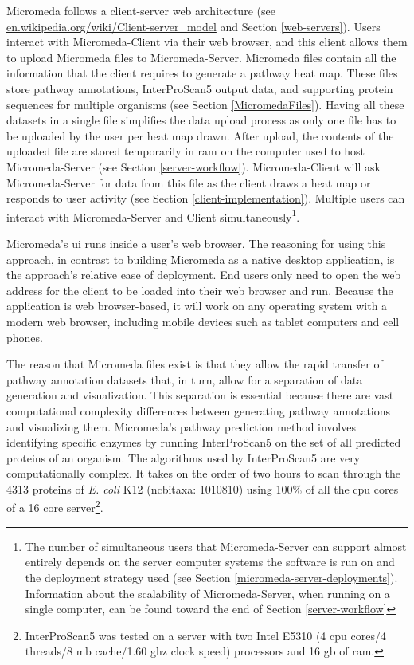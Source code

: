 Micromeda follows a client-server web architecture \cite{svobodova1985client} 
(see 
\href{http://en.wikipedia.org/wiki/Client-server_model}{en.wikipedia.org/wiki/Client-server\_model} 
and Section \ref{web-servers}). Users interact with Micromeda-Client via their 
web browser, and this client allows them to upload Micromeda files to 
Micromeda-Server. Micromeda files contain all the information that the client 
requires to generate a pathway heat map. These files store pathway annotations, 
InterProScan5 output data, and supporting protein sequences for multiple 
organisms (see Section \ref{MicromedaFiles}). Having all these datasets in a 
single file simplifies the data upload process as only one file has to be 
uploaded by the user per heat map drawn. After upload, the contents of the 
uploaded file are stored temporarily in \gls{ram} on the computer used to host 
Micromeda-Server (see Section \ref{server-workflow}). Micromeda-Client will ask 
Micromeda-Server for data from this file as the client draws a heat map or 
responds to user activity (see Section \ref{client-implementation}). Multiple 
users can interact with Micromeda-Server and Client simultaneously\footnote{The 
number of simultaneous users that Micromeda-Server can support almost entirely 
depends on the server computer systems the software is run on and the deployment 
strategy used (see Section \ref{micromeda-server-deployments}). 
Information about the scalability of Micromeda-Server, when running on a single 
computer, can be found toward the end of Section \ref{server-workflow}}.

Micromeda's \gls{ui} runs inside a user's web browser. The reasoning for using 
this approach, in contrast to building Micromeda as a native desktop 
application, is the approach's relative ease of deployment. End users only need 
to open the web address for the client to be loaded into their web browser and 
run. Because the application is web browser-based, it will work on any operating 
system with a modern web browser, including mobile devices such as tablet 
computers and cell phones.

The reason that Micromeda files exist is that they allow the rapid transfer of pathway 
annotation datasets that, in turn, allow for a separation of data generation and 
visualization. This separation is essential because there are vast computational 
complexity differences between generating pathway annotations and visualizing 
them. Micromeda's pathway prediction method involves identifying 
specific enzymes by running InterProScan5 on the set of all predicted proteins 
of an organism. The algorithms used by InterProScan5 are very computationally 
complex. It takes on the order of two hours to scan through the 4313 proteins of 
\textit{E. coli} K12 (\gls{ncbitaxa}: 1010810) using 100\% of all the \gls{cpu} 
cores of a 16 core server\footnote{InterProScan5 was tested on a server with two 
Intel E5310 (4 \gls{cpu} cores/4 threads/8 \gls{mb} cache/1.60 \gls{ghz} clock 
speed) processors and 16 \gls{gb}  of \gls{ram}.}.

